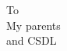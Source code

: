 
\begin{dedication}\null\vfil
{\large
\begin{center}
To \\\vspace{12pt}
My parents\\\vspace{12pt}
and CSDL\\\vspace{12pt}
\end{center}}
\vfil\null
\end{dedication}
